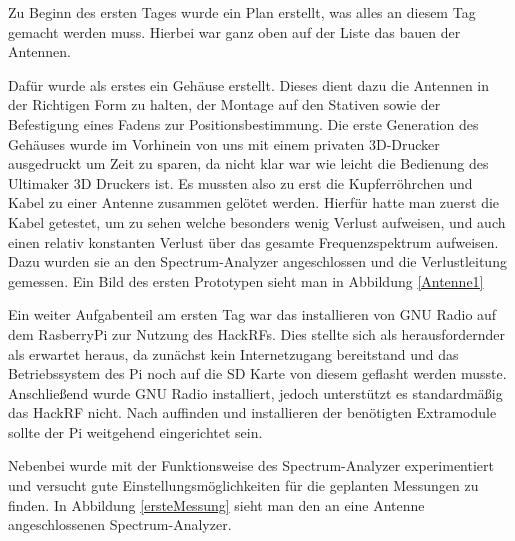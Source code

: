\documentclass[titlepage,11pt,a4paper,ngerman]{article}
\begin{document}
Zu Beginn des ersten Tages wurde ein Plan erstellt, was alles an diesem Tag gemacht werden muss. Hierbei war ganz oben auf der Liste das bauen der Antennen.\par
Dafür wurde als erstes ein Gehäuse erstellt. Dieses dient dazu die Antennen in der Richtigen Form zu halten, der Montage auf den Stativen sowie der Befestigung eines Fadens zur Positionsbestimmung. Die erste Generation des Gehäuses wurde im Vorhinein von uns mit einem privaten 3D-Drucker ausgedruckt um Zeit zu sparen, da nicht klar war wie leicht die Bedienung des Ultimaker 3D Druckers ist. Es mussten also zu erst die Kupferröhrchen und Kabel zu einer Antenne zusammen gelötet werden. Hierfür hatte man zuerst die Kabel getestet, um zu sehen welche besonders wenig Verlust aufweisen, und auch einen relativ konstanten Verlust über das gesamte Frequenzspektrum aufweisen. Dazu wurden sie an den Spectrum-Analyzer angeschlossen und die Verlustleitung gemessen. Ein Bild des ersten Prototypen sieht man in Abbildung \ref{Antenne1}\par
Ein weiter Aufgabenteil am ersten Tag war das installieren von GNU Radio auf dem RasberryPi zur Nutzung des HackRFs. Dies stellte sich als herausfordernder als erwartet heraus, da zunächst kein Internetzugang bereitstand und das Betriebssystem des Pi noch auf die SD Karte von diesem geflasht werden musste. Anschließend wurde GNU Radio installiert, jedoch unterstützt es standardmäßig das HackRF nicht. Nach auffinden und installieren der benötigten Extramodule sollte der Pi weitgehend eingerichtet sein.\par
Nebenbei wurde mit der Funktionsweise des Spectrum-Analyzer experimentiert und versucht gute Einstellungsmöglichkeiten für die geplanten Messungen zu finden. In Abbildung \ref{ersteMessung} sieht man den an eine Antenne angeschlossenen Spectrum-Analyzer. 
\end{document}
